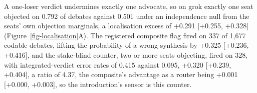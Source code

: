 A one-loser verdict undermines exactly one advocate, so on grok exactly one
seat objected
on 0.792 of debates against 0.501 under an independence null from the
seats' own objection marginals, a localisation excess of +0.291
[+0.255, +0.328] (Figure~\ref{fig-localisation}A).
The registered composite flag fired on 337 of 1,677 codable debates,
lifting the probability of a wrong synthesis by +0.325 [+0.236, +0.416],
and the stake-blind counter, two or more seats objecting, fired on 328,
with integrated-verdict error rates of 0.415 against 0.095, +0.320
[+0.239, +0.404], a ratio of 4.37, %
the composite's advantage as a router being +0.001 [+0.000, +0.003], so
the introduction's sensor is this counter.

